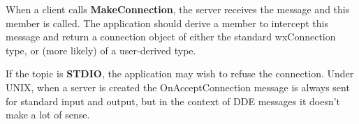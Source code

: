 
When a client calls {\bf MakeConnection}, the server receives the
message and this member is called. The application should derive a
member to intercept this message and return a connection object of
either the standard wxConnection type, or (more likely) of a
user-derived type.

If the topic is {\bf STDIO}, the application may wish to refuse the
connection. Under UNIX, when a server is created the
OnAcceptConnection message is always sent for standard input and
output, but in the context of DDE messages it doesn't make a lot
of sense.

